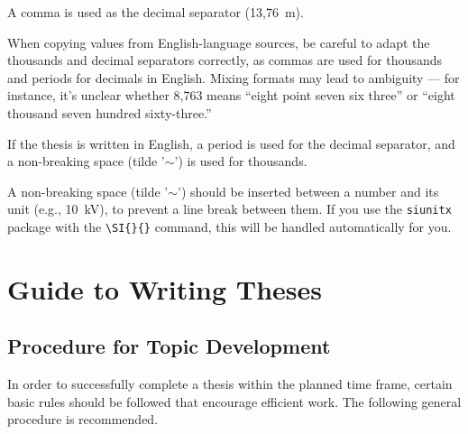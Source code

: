 \documentclass[a4paper, fleqn, headsepline, footsepline, 12pt, parskip=half]{scrartcl}
\begin{document}
A comma is used as the decimal separator (13,76~m).

When copying values from English-language sources, be careful to adapt the thousands and decimal separators correctly, as commas are used for thousands and periods for decimals in English. Mixing formats may lead to ambiguity — for instance, it's unclear whether 8,763 means “eight point seven six three” or “eight thousand seven hundred sixty-three.”

If the thesis is written in English, a period is used for the decimal separator, and a non-breaking space (tilde '$\sim$') is used for thousands.

A non-breaking space (tilde '$\sim$') should be inserted between a number and its unit (e.g., 10~kV), to prevent a line break between them. If you use the \texttt{siunitx} package with the \verb|\SI{}{}| command, this will be handled automatically for you.


\newpage
\section{Guide to Writing Theses}
\label{sec:guideToWritingTheses}

\subsection{Procedure for Topic Development}
\label{sec:procedureForTopicDevelopment}

In order to successfully complete a thesis within the planned time frame, certain basic rules should be followed that encourage efficient work. The following general procedure is recommended.
\end{document}
